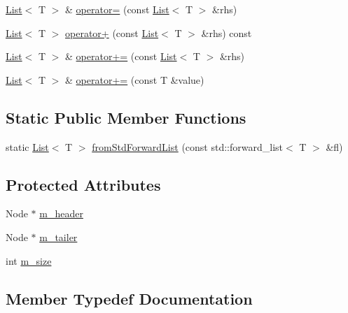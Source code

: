 \begin{DoxyCompactItemize}
\hyperlink{classprism_1_1_list}{List}$<$ T $>$ \& \hyperlink{classprism_1_1_list_abb977e2c0b880c7a381ea14f25417e4f}{operator=} (const \hyperlink{classprism_1_1_list}{List}$<$ T $>$ \&rhs)
\item 
\hyperlink{classprism_1_1_list}{List}$<$ T $>$ \hyperlink{classprism_1_1_list_ad578cb4c80ff86d9edb989ade883c18f}{operator+} (const \hyperlink{classprism_1_1_list}{List}$<$ T $>$ \&rhs) const 
\item 
\hyperlink{classprism_1_1_list}{List}$<$ T $>$ \& \hyperlink{classprism_1_1_list_a84972c1e847fdf2c2ca197d7812af3a0}{operator+=} (const \hyperlink{classprism_1_1_list}{List}$<$ T $>$ \&rhs)
\item 
\hyperlink{classprism_1_1_list}{List}$<$ T $>$ \& \hyperlink{classprism_1_1_list_a5e68dad596d72d1c00f9d12bb21479d6}{operator+=} (const T \&value)
\end{DoxyCompactItemize}
\subsection*{Static Public Member Functions}
\begin{DoxyCompactItemize}
\item 
static \hyperlink{classprism_1_1_list}{List}$<$ T $>$ \hyperlink{classprism_1_1_list_a5dd072cd1d777dd751fc2d0deee00e31}{from\+Std\+Forward\+List} (const std\+::forward\+\_\+list$<$ T $>$ \&fl)
\end{DoxyCompactItemize}
\subsection*{Protected Attributes}
\begin{DoxyCompactItemize}
\item 
Node $\ast$ \hyperlink{classprism_1_1_list_ade9dd1234d468fdcbcddb16eb490d296}{m\+\_\+header}
\item 
Node $\ast$ \hyperlink{classprism_1_1_list_a0740989f0d5af2bad19850fac850947e}{m\+\_\+tailer}
\item 
int \hyperlink{classprism_1_1_list_ae86f48e50ec12239597de98deb36b4a4}{m\+\_\+size}
\end{DoxyCompactItemize}


\subsection{Member Typedef Documentation}
